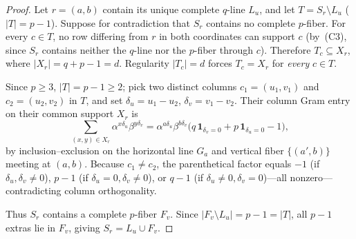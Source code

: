 \documentclass[11pt,reqno]{amsart}
\numberwithin{equation}{section}
\theoremstyle{definition}
\theoremstyle{remark}
\begin{document}
\begin{proof}
Let $r=(a,b)$ contain its unique complete $q$-line $L_u$, and let $T=S_r\setminus L_u$ ($|T|=p-1$). Suppose for contradiction that $S_r$ contains no complete $p$-fiber. For every $c\in T$, no row differing from $r$ in both coordinates can support $c$ (by~(C3), since $S_r$ contains neither the $q$-line nor the $p$-fiber through $c$). Therefore $T_c\subseteq X_r$, where $|X_r|=q+p-1=d$. Regularity $|T_c|=d$ forces $T_c = X_r$ for \emph{every} $c\in T$.

Since $p\ge 3$, $|T|=p-1\ge 2$; pick two distinct columns $c_1=(u_1,v_1)$ and $c_2=(u_2,v_2)$ in $T$, and set $\delta_u=u_1-u_2$, $\delta_v=v_1-v_2$. Their column Gram entry on their common support $X_r$ is
\begin{equation}
\label{eq:cross-gram}
\sum_{(x,y)\in X_r} \alpha^{x\delta_u}\beta^{y\delta_v}
= \alpha^{a\delta_u}\beta^{b\delta_v}\bigl(q\,\mathbf{1}_{\delta_v=0} + p\,\mathbf{1}_{\delta_u=0} - 1\bigr),
\end{equation}
by inclusion--exclusion on the horizontal line $G_a$ and vertical fiber $\{(a',b)\}$ meeting at $(a,b)$. Because $c_1\neq c_2$, the parenthetical factor equals $-1$ (if $\delta_u,\delta_v\neq 0$), $p-1$ (if $\delta_u=0,\delta_v\neq 0$), or $q-1$ (if $\delta_u\neq 0,\delta_v=0$)---all nonzero---contradicting column orthogonality.

Thus $S_r$ contains a complete $p$-fiber $F_v$. Since $|F_v\setminus L_u|=p-1=|T|$, all $p-1$ extras lie in $F_v$, giving $S_r=L_u\cup F_v$.
\end{proof}
\end{document}
